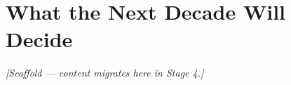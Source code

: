 \chapter{What the Next Decade Will Decide}
\label{chap:nextobs}


\noindent\emph{[Scaffold --- content migrates here in Stage 4.]}
